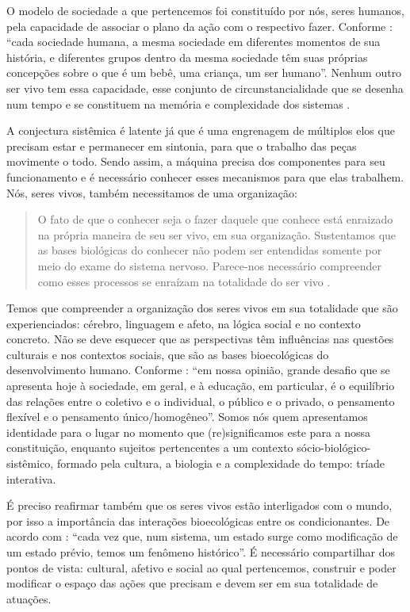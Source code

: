 \documentclass{textolivre}
\begin{document}
O modelo de sociedade a que pertencemos foi constituído por nós, seres humanos, pela capacidade de associar o plano da ação com o respectivo fazer. Conforme \textcite[p. 91]{carvalho2012}: “cada sociedade humana, a mesma sociedade em diferentes momentos de sua história, e diferentes grupos dentro da mesma sociedade têm suas próprias concepções sobre o que é um bebê, uma criança, um ser humano”. Nenhum outro ser vivo tem essa capacidade, esse conjunto de circunstancialidade que se desenha num tempo e se constituem na memória e complexidade dos sistemas \cite{piske2019}. 

A conjectura sistêmica é latente já que é uma engrenagem de múltiplos elos que precisam estar e permanecer em sintonia, para que o trabalho das peças movimente o todo. Sendo assim, a máquina precisa dos componentes para seu funcionamento e é necessário conhecer esses mecanismos para que elas trabalhem. Nós, seres vivos, também necessitamos de uma organização:

\begin{quote}
O fato de que o conhecer seja o fazer daquele que conhece está enraizado na própria maneira de seu ser vivo, em sua organização. Sustentamos que as bases biológicas do conhecer não podem ser entendidas somente por meio do exame do sistema nervoso. Parece-nos necessário compreender como esses processos se enraízam na totalidade do ser vivo \cite[p. 40]{maturana2011}.
\end{quote}


Temos que compreender a organização dos seres vivos em sua totalidade que são experienciados: cérebro, linguagem e afeto, na lógica social e no contexto concreto. Não se deve esquecer que as perspectivas têm influências nas questões culturais e nos contextos sociais, que são as bases bioecológicas do desenvolvimento humano. Conforme \textcite[p. 31]{gomes2013}: “em nossa opinião, grande desafio que se apresenta hoje à sociedade, em geral, e à educação, em particular, é o equilíbrio das relações entre o coletivo e o individual, o público e o privado, o pensamento flexível e o pensamento único/homogêneo”. Somos nós quem apresentamos identidade para o lugar no momento que (re)significamos este para a nossa constituição, enquanto sujeitos pertencentes a um contexto sócio-biológico-sistêmico, formado pela cultura, a biologia e a complexidade do tempo: tríade interativa.

É preciso reafirmar também que os seres vivos estão interligados com o mundo, por isso a importância das interações bioecológicas entre os condicionantes. De acordo com \textcite[p. 67]{maturana2011}: “cada vez que, num sistema, um estado surge como modificação de um estado prévio, temos um fenômeno histórico”. É necessário compartilhar dos pontos de vista: cultural, afetivo e social ao qual pertencemos, construir e poder modificar o espaço das ações que precisam e devem ser em sua totalidade de atuações.
\end{document}
